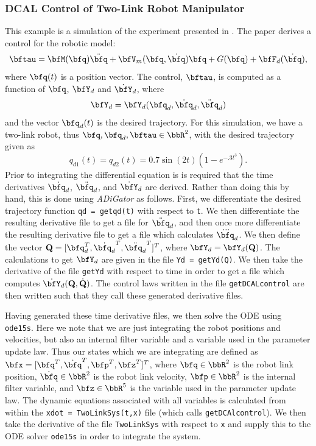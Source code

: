 \documentclass[10pt,pdftex]{article}
\begin{document}
\subsubsection{DCAL Control of Two-Link Robot Manipulator}
This example is a simulation of the experiment presented in \cite{Burg97}. The paper derives a control for the robotic model:
\begin{equation}
\bftau = \bfM(\bfq)\ddot{\bfq} + \bfV_m(\bfq,\dot{\bfq}) \bfq + G(\bfq) + \bfF_d(\dot{\bfq}),
\end{equation}
where $\bfq(t)$ is a position vector. The control, $\bftau$, is computed as a function of $\bfq$, $\bfY_d$ and $\dot{\bfY}_d$, where
\begin{equation}
\bfY_d = \bfY_d(\bfq_d,\dot{\bfq}_d,\ddot{\bfq}_d)
\end{equation}
and the vector $\bfq_d(t)$ is the desired trajectory. For this simulation, we have a two-link robot, thus $\bfq,\bfq_d,\bftau \in \bbR^2$, with the desired trajectory given as
\begin{equation}
q_{d1}(t) = q_{d2}(t) = 0.7\sin(2t)\left(1-e^{-.3t^3}\right).
\end{equation}
Prior to integrating the differential equation is is required that the time derivatives $\dot{\bfq_d}$, $\ddot{\bfq_d}$, and $\dot{\bfY}_d$ are derived. Rather than doing this by hand, this is done using \emph{ADiGator} as follows. First, we differentiate the desired trajectory function \texttt{qd = getqd(t)} with respect to \texttt{t}. We then differentiate the resulting derivative file to get a file for $\ddot{\bfq}_d$, and then once more differentiate the resulting derivative file to get a file which calculates $\dddot{\bfq}_d$. We then define the vector $\textbf{Q} = [\bfq_d^T, \dot{\bfq_d}^T, \ddot{\bfq_d}^T]^T$, where $\bfY_d = \bfY_d(\textbf{Q})$. The calculations to get $\bfY_d$ are given in the file \texttt{Yd = getYd(Q)}. We then take the derivative of the file \texttt{getYd} with respect to time in order to get a file which computes $\dot{\bfY}_d(\textbf{Q},\dot{\textbf{Q}})$. The control laws written in the file \texttt{getDCALcontrol} are then written such that they call these generated derivative files.

Having generated these time derivative files, we then solve the ODE using \texttt{ode15s}. Here we note that we are just integrating the robot positions and velocities, but also an internal filter variable and a variable used in the parameter update law. Thus our states which we are integrating are defined as $\bfx = [\bfq^T, \dot{\bfq}^T, \bfp^T, \bfz^T]^T$, where $\bfq\in\bbR^2$ is the robot link position, $\dot{\bfq}\in\bbR^2$ is the robot link velocity, $\bfp\in\bbR^2$ is the internal filter variable, and $\bfz\in\bbR^5$ is the variable used in the parameter update law. The dynamic equations associated with all variables is calculated from within the \texttt{xdot = TwoLinkSys(t,x)} file (which calls \texttt{getDCAlcontrol}). We then take the derivative of the file \texttt{TwoLinkSys} with respect to \texttt{x} and supply this to the ODE solver \texttt{ode15s} in order to integrate the system.
\end{document}
